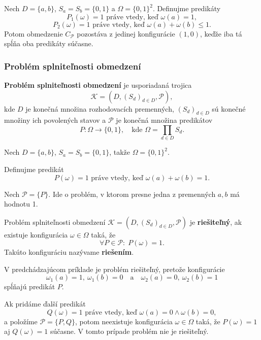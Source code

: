 \begin{example}
    Nech $D=\{a,b\}$, $S_a=S_b=\{0,1\}$ a $\Omega=\{0,1\}^2$.
    Definujme predikáty
    \[
        P_1(\omega)=1 \text{ práve vtedy, keď } \omega(a)=1,
    \]
    \[
        P_2(\omega)=1 \text{ práve vtedy, keď } \omega(a)+\omega(b)\le 1.
    \]
    Potom obmedzenie $C_{\mathcal{P}}$ pozostáva z jedinej konfigurácie $(1,0)$,
    keďže iba tá spĺňa oba predikáty súčasne.
\end{example}

\subsubsection{Problém splniteľnosti obmedzení}\label{sec:combinatorics:csp}

\begin{definition}
    \textbf{Problém splniteľnosti obmedzení} je usporiadaná trojica
    \[
        \mathcal{K} = (D, (S_d)_{d \in D}, \mathcal{P}),
    \]
    kde $D$ je konečná množina rozhodovacích premenných,
    $(S_d)_{d \in D}$ sú konečné množiny ich povolených stavov a
    $\mathcal{P}$ je konečná množina predikátov
    \[
        P : \Omega \to \{0,1\},
        \quad
        \text{kde }
        \Omega = \prod_{d \in D} S_d.
    \]
\end{definition}

\begin{example}
    Nech $D=\{a,b\}$, $S_a=S_b=\{0,1\}$, takže
    $\Omega=\{0,1\}^2$.

    Definujme predikát
    \[
        P(\omega)=1 \text{ práve vtedy, keď } \omega(a)+\omega(b)=1.
    \]

    Nech $\mathcal{P}=\{P\}$.
    Ide o problém, v ktorom presne jedna z premenných $a,b$ má hodnotu 1.
\end{example}

\begin{definition}
    Problém splniteľnosti obmedzení
    $\mathcal{K} = (D, (S_d)_{d \in D}, \mathcal{P})$
    je \textbf{riešiteľný}, ak existuje konfigurácia
    $\omega \in \Omega$ taká, že
    \[
        \forall P \in \mathcal{P}:\; P(\omega)=1.
    \]
    Takúto konfiguráciu nazývame \textbf{riešením}.
\end{definition}

\begin{example}
    V predchádzajúcom príklade je problém riešiteľný, pretože konfigurácie
    \[
        \omega_1(a)=1,\ \omega_1(b)=0
        \quad \text{a} \quad
        \omega_2(a)=0,\ \omega_2(b)=1
    \]
    spĺňajú predikát $P$.

    Ak pridáme ďalší predikát
    \[
        Q(\omega)=1 \text{ práve vtedy, keď } \omega(a)=0 \land \omega(b)=0,
    \]
    a položíme $\mathcal{P}=\{P,Q\}$, potom neexistuje konfigurácia
    $\omega \in \Omega$ taká, že $P(\omega)=1$ aj $Q(\omega)=1$ súčasne.
    V tomto prípade problém nie je riešiteľný.
\end{example}

